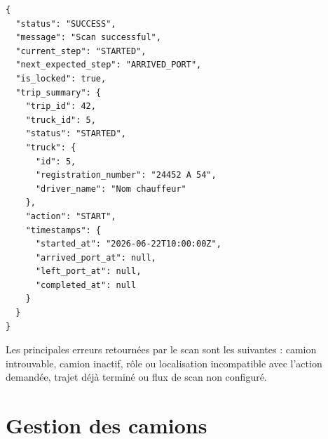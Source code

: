 \begin{lstlisting}[language={},caption={Exemple de réponse après scan réussi}]
{
  "status": "SUCCESS",
  "message": "Scan successful",
  "current_step": "STARTED",
  "next_expected_step": "ARRIVED_PORT",
  "is_locked": true,
  "trip_summary": {
    "trip_id": 42,
    "truck_id": 5,
    "status": "STARTED",
    "truck": {
      "id": 5,
      "registration_number": "24452 A 54",
      "driver_name": "Nom chauffeur"
    },
    "action": "START",
    "timestamps": {
      "started_at": "2026-06-22T10:00:00Z",
      "arrived_port_at": null,
      "left_port_at": null,
      "completed_at": null
    }
  }
}
\end{lstlisting}

Les principales erreurs retournées par le scan sont les suivantes : camion introuvable, camion inactif, rôle ou localisation incompatible avec l'action demandée, trajet déjà terminé ou flux de scan non configuré.

\section{Gestion des camions}

